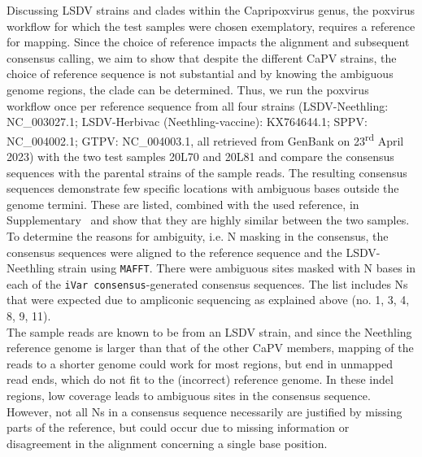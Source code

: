 Discussing \ac{LSDV} strains and clades within the Capripoxvirus genus, the poxvirus workflow for which the test samples were chosen exemplatory, requires a reference for mapping. Since the choice of reference impacts the alignment and subsequent consensus calling, we aim to show that despite the different \ac{CaPV} strains, the choice of reference sequence is not substantial and by knowing the ambiguous genome regions, the clade can be determined. Thus, we run the poxvirus workflow once per reference sequence from all four strains (\ac{LSDV}-Neethling: NC\_003027.1; \ac{LSDV}-Herbivac (Neethling-vaccine): KX764644.1; SPPV: NC\_004002.1; \ac{GTPV}: NC\_004003.1, all retrieved from GenBank on 23\textsuperscript{rd} April 2023) with the two test samples 20L70 and 20L81 and compare the consensus sequences with the parental strains of the sample reads. The resulting consensus sequences demonstrate few specific locations with ambiguous bases outside the genome termini. These are listed, combined with the used reference, in Supplementary~ and show that they are highly similar between the two samples. To determine the reasons for ambiguity, i.e. N masking in the consensus, the consensus sequences were aligned to the reference sequence and the \ac{LSDV}-Neethling strain using \texttt{\acs{MAFFT}}. There were ambiguous sites masked with N bases in each of the \texttt{iVar consensus}-generated consensus sequences. The list includes Ns that were expected due to ampliconic sequencing as explained above (no. 1, 3, 4, 8, 9, 11).\\
The sample reads are known to be from an \ac{LSDV} strain, and since the Neethling reference genome is larger than that of the other \acs{CaPV} members, mapping of the reads to a shorter genome could work for most regions, but end in unmapped read ends, which do not fit to the (incorrect) reference genome. In these indel regions, low coverage leads to ambiguous sites in the consensus sequence. However, not all Ns in a consensus sequence necessarily are justified by missing parts of the reference, but could occur due to missing information or disagreement in the alignment concerning a single base position.\\
